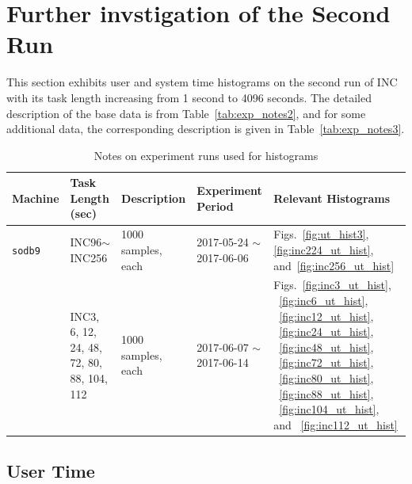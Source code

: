 \section{Further invstigation of the Second Run~\label{sec:u_s_time_hist}} 
This section exhibits user and system time histograms on the second run of 
INC with its task length increasing from 1 second to 4096 seconds. 
The detailed description of the base data is from Table~\ref{tab:exp_notes2}, 
and for some additional data, the corresponding description is given in Table~\ref{tab:exp_notes3}.

\begin{table}[h]
\begin{center}
\begin{tabular}{|p{2cm}|p{3cm}|p{3cm}|p{4cm}|p{3.5cm}|} \hline
Machine & Task Length (sec) & Description & Experiment Period & Relevant \linebreak Histograms\\ \hline
{\tt sodb9} &  INC96$\sim$INC256 & 1000 samples, each & 2017-05-24 $\sim$ 2017-06-06 & 
Figs.~\ref{fig:ut_hist3}, \ref{fig:inc224_ut_hist}, and~\ref{fig:inc256_ut_hist}\\ \hline
					&  INC3, 6, 12, 24, 48, 72, 80, 88, 104, 112 & 1000 samples, each & 2017-06-07 $\sim$ 2017-06-14 & Figs.~\ref{fig:inc3_ut_hist}, ~\ref{fig:inc6_ut_hist}, ~\ref{fig:inc12_ut_hist}, ~\ref{fig:inc24_ut_hist},
~\ref{fig:inc48_ut_hist}, ~\ref{fig:inc72_ut_hist}, ~\ref{fig:inc80_ut_hist}, ~\ref{fig:inc88_ut_hist}, ~\ref{fig:inc104_ut_hist}, and ~\ref{fig:inc112_ut_hist}\\ \hline
\end{tabular}
\end{center}
\vspace{-.2in}
\caption{Notes on experiment runs used for histograms\label{tab:exp_notes4}}
\end{table}

\newpage
\subsection{User Time}

